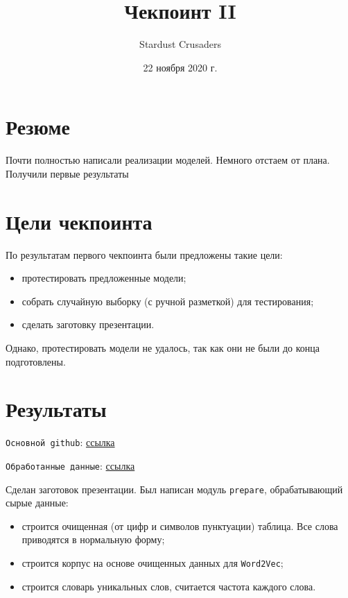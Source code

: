 \documentclass{article}
\title{Чекпоинт II}
\author{Stardust Crusaders}
\date{22 ноября 2020 г.}
\begin{document}
\maketitle
\tableofcontents

\section*{Резюме}
Почти полностью написали реализации моделей. Немного отстаем от плана. Получили первые результаты

\newpage
\section{Цели чекпоинта}
По результатам первого чекпоинта были предложены такие цели:
\begin{itemize}
    \item протестировать предложенные модели;
    \item собрать случайную выборку (с ручной разметкой) для тестирования;
    \item сделать заготовку презентации.
\end{itemize}

Однако, протестировать модели не удалось, так как они не были до конца подготовлены. 

\section{Результаты}

\texttt{Основной github}: \href{https://github.com/Desiment/safety-barriers}{ссылка} 

\texttt{Обработанные данные}: \href{https://drive.google.com/drive/folders/1XhPnQkAMY1KkejASQoEDTFzi1GouzvbE?usp=sharing}{ссылка} 

Сделан заготовок презентации.
Был написан модуль \texttt{prepare}, обрабатывающий сырые данные:
\begin{itemize}
    \item строится очищенная (от цифр и символов пунктуации) таблица. Все слова приводятся в нормальную форму;
    \item строится корпус на основе очищенных данных для \texttt{Word2Vec};
    \item строится словарь уникальных слов, считается частота каждого слова.
\end{itemize}
\end{document}
